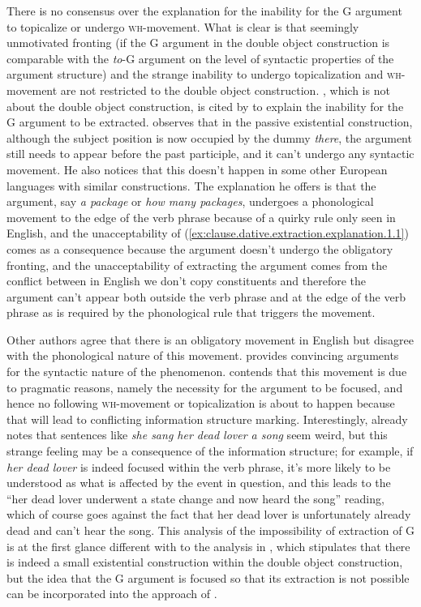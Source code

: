 \documentclass[UTF8, a4paper, oneside, scheme=plain, 12pt]{ctexbook}
\newcommand{\form}[1]{\emph{#1}}
\newcommand{\category}[1]{\textsc{#1}}
\begin{document}
There is no consensus over the explanation for the inability for the G argument 
to topicalize or undergo \category{wh}-movement.
What is clear is that seemingly unmotivated fronting 
(if the G argument in the double object construction 
is comparable with the \form{to}-G argument on the level of syntactic properties of the argument structure) 
and the strange inability to undergo topicalization and \category{wh}-movement 
are not restricted to the double object construction.
\citet{chomsky2001}, which is not about the double object construction, is cited by \citet{oba2005double} 
to explain the inability for the G argument to be extracted.
\citet{chomsky2001} observes that in the passive existential construction,
although the subject position is now occupied by the dummy \form{there}, 
the argument still needs to appear before the past participle, 
and it can't undergo any syntactic movement.
He also notices that this doesn't happen in some other European languages with similar constructions.
The explanation he offers is that the argument, say \form{a package} or \form{how many packages},
undergoes a phonological movement to the edge of the verb phrase 
because of a quirky rule only seen in English,
and the unacceptability of (\ref{ex:clause.dative.extraction.explanation.1.1}) comes as a consequence
because the argument doesn't undergo the obligatory fronting,
and the unacceptability of extracting the argument comes from the conflict 
between in English we don't copy constituents and therefore the argument can't appear 
both outside the verb phrase and at the edge of the verb phrase 
as is required by the phonological rule that triggers the movement.

Other authors agree that there is an obligatory movement in English
but disagree with the phonological nature of this movement.
\citet{julien2002syntax} provides convincing arguments for the syntactic nature of the phenomenon.
\citep{im2005alternative} contends that this movement is due to pragmatic reasons, 
namely the necessity for the argument to be focused,
and hence no following \category{wh}-movement or topicalization is about to happen 
because that will lead to conflicting information structure marking.
Interestingly, \citet{baker1997thematic} already notes that sentences like 
\form{she sang her dead lover a song} seem weird, 
but this strange feeling may be a consequence of the information structure;
for example, if \form{her dead lover} is indeed focused within the verb phrase, 
it's more likely to be understood as what is affected by the event in question, 
and this leads to the ``her dead lover underwent a state change and now heard the song'' reading, 
which of course goes against the fact that her dead lover is unfortunately already dead and can't hear the song.
This analysis of the impossibility of extraction of G is 
at the first glance different with to the analysis in \citet{oba2005double}, 
which stipulates that there is indeed a small existential construction 
within the double object construction, 
but the idea that the G argument is focused so that its extraction is not possible 
can be incorporated into the approach of \citet{oba2005double}.
\end{document}
